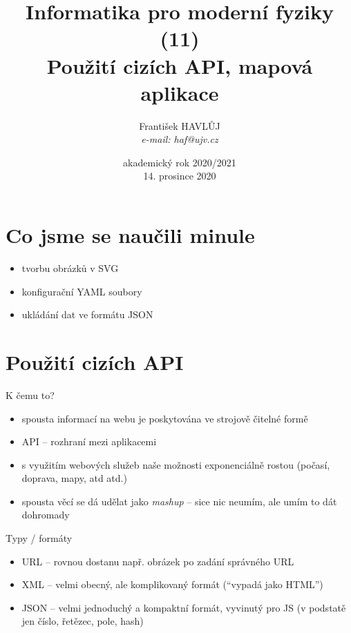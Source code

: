 \documentclass{beamer}
\title[IMF (11)]{Informatika pro moderní fyziky (11)\\ Použití cizích API, mapová aplikace}
\author[Franti\v{s}ek HAVL\r{U}J, ORF ÚJV Řež]{Franti\v{s}ek HAVL\r{U}J\\{\scriptsize \emph{e-mail: haf@ujv.cz}}}
\date{akademický rok 2020/2021\\14. prosince 2020}
\institute[ORF ÚJV Řež]
{ÚJV Řež\\oddělení Reaktorové fyziky a podpory palivového cyklu}
\begin{document}
\begin{frame}
  \titlepage
\end{frame}

\begin{frame}
  \tableofcontents
\end{frame}

\section{Co jsme se naučili minule}

\begin{frame}{}
  \begin{itemize}
    \item tvorbu obrázků v SVG
    \item konfigurační YAML soubory
    \item ukládání dat ve formátu JSON
  \end{itemize}
\end{frame}


\section{Použití cizích API}

\begin{frame}{K čemu to?}
  \begin{itemize}
    \item spousta informací na webu je poskytována ve strojově čitelné formě
    \item API -- rozhraní mezi aplikacemi
    \item s využitím webových služeb naše možnosti exponenciálně rostou (počasí, doprava, mapy, atd atd.)
    \item spousta věcí se dá udělat jako \emph{mashup} -- sice nic neumím, ale umím to dát dohromady
  \end{itemize}
\end{frame}


\begin{frame}{Typy / formáty}
  \begin{itemize}
    \item URL -- rovnou dostanu např. obrázek po zadání správného URL
    \item XML -- velmi obecný, ale komplikovaný formát (``vypadá jako HTML'')
    \item JSON -- velmi jednoduchý a kompaktní formát, vyvinutý pro JS (v podstatě jen číslo, řetězec, pole, hash)
  \end{itemize}
\end{frame}
\end{document}
